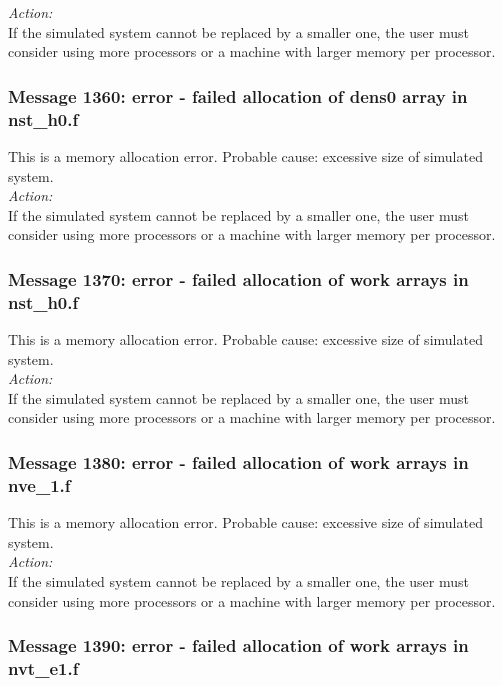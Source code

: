 \noindent
{\em Action:}\\
If the simulated system cannot be replaced by a smaller one, the user
must consider using more processors or a machine with larger memory
per processor.

\subsubsection*{Message 1360: error - failed allocation of dens0 array
in nst\_h0.f}

This is a memory allocation error. Probable cause: excessive size of
simulated system. \\

\noindent
{\em Action:}\\
If the simulated system cannot be replaced by a smaller one, the user
must consider using more processors or a machine with larger memory
per processor.

\subsubsection*{Message 1370: error - failed allocation of work arrays
in nst\_h0.f}

This is a memory allocation error. Probable cause: excessive size of
simulated system. \\

\noindent
{\em Action:}\\
If the simulated system cannot be replaced by a smaller one, the user
must consider using more processors or a machine with larger memory
per processor.

\subsubsection*{Message 1380: error - failed allocation of work arrays
in nve\_1.f}

This is a memory allocation error. Probable cause: excessive size of
simulated system. \\

\noindent
{\em Action:}\\
If the simulated system cannot be replaced by a smaller one, the user
must consider using more processors or a machine with larger memory
per processor.

\subsubsection*{Message 1390: error - failed allocation of work arrays
in nvt\_e1.f}

